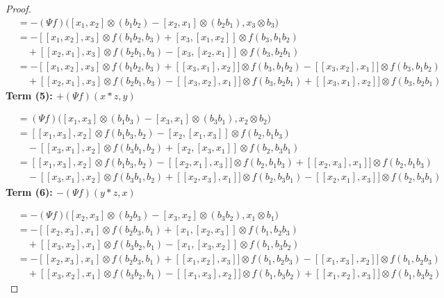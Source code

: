 \documentclass[a4paper, 12pt,oneside,reqno]{amsart}
\begin{document}
\begin{proof}
\begin{align*}
&= -(\Psi f)\Big([x_1, x_2] \otimes (b_1 b_2) - [x_2, x_1] \otimes (b_2 b_1), x_3 \otimes b_3\Big) \\
&= - [[x_1, x_2], x_3] \otimes f( b_1 b_2, b_3) + [x_3, [x_1, x_2]] \otimes f(b_3,b_1 b_2) \\
&\quad + [[x_2, x_1], x_3] \otimes f(b_2 b_1, b_3) -[x_3, [x_2, x_1]] \otimes f( b_3,b_2  b_1)\\
&= - [[x_1, x_2], x_3] \otimes f( b_1 b_2, b_3) + [[x_3, x_1], x_2]] \otimes f(b_3,b_1 b_2)-[[x_3, x_2], x_1]] \otimes f(b_3,b_1 b_2) \\
&\quad + [[x_2, x_1], x_3] \otimes f(b_2 b_1, b_3) -[[x_3, x_2], x_1]] \otimes f( b_3,b_2  b_1)+[[x_3, x_1], x_2]] \otimes f( b_3,b_2  b_1)
\end{align*}
\textbf{Term (5): $+(\Psi f)(x \ast z, y)$}

\begin{align*}
&= (\Psi f)\Big([x_1, x_3] \otimes (b_1 b_3) - [x_3, x_1] \otimes (b_3 b_1), x_2 \otimes b_2\Big) \\
&=  [[x_1, x_3], x_2] \otimes f( b_1 b_3, b_2) - [x_2, [x_1, x_3]] \otimes f(b_2,b_1 b_3) \\
&\quad - [[x_3, x_1], x_2] \otimes f(b_3 b_1, b_2) +[x_2, [x_3, x_1]] \otimes f( b_2,b_3  b_1)\\
&=  [[x_1, x_3], x_2] \otimes f( b_1 b_3, b_2) - [[x_2, x_1], x_3]] \otimes f(b_2,b_1 b_3)+[[x_2, x_3], x_1]] \otimes f(b_2,b_1 b_3) \\
&\quad - [[x_3, x_1], x_2] \otimes f(b_3 b_1, b_2) +[[x_2, x_3], x_1]] \otimes f( b_2,b_3  b_1)-[[x_2, x_1], x_3]] \otimes f( b_2,b_3  b_1)
\end{align*}
\textbf{Term (6): $-(\Psi f)(y \ast z, x)$}

\begin{align*}
&= -(\Psi f)\Big([x_2, x_3] \otimes (b_2 b_3) - [x_3, x_2] \otimes (b_3 b_2), x_1 \otimes b_1\Big) \\
&=  -[[x_2, x_3], x_1] \otimes f( b_2 b_3, b_1) + [x_1, [x_2, x_3]] \otimes f(b_1,b_2 b_3) \\
&\quad + [[x_3, x_2], x_1] \otimes f(b_3 b_2, b_1) -[x_1, [x_3, x_2]] \otimes f( b_1,b_3  b_2)\\
&=  -[[x_2, x_3], x_1] \otimes f( b_2 b_3, b_1) + [[x_1, x_2], x_3]] \otimes f(b_1,b_2 b_3)-[[x_1, x_3], x_2]] \otimes f(b_1,b_2 b_3) \\
&\quad + [[x_3, x_2], x_1] \otimes f(b_3 b_2, b_1) -[[x_1, x_3], x_2]] \otimes f( b_1,b_3  b_2)+[[x_1, x_2], x_3]] \otimes f( b_1,b_3  b_2)
\end{align*}



\end{proof}
\end{document}
